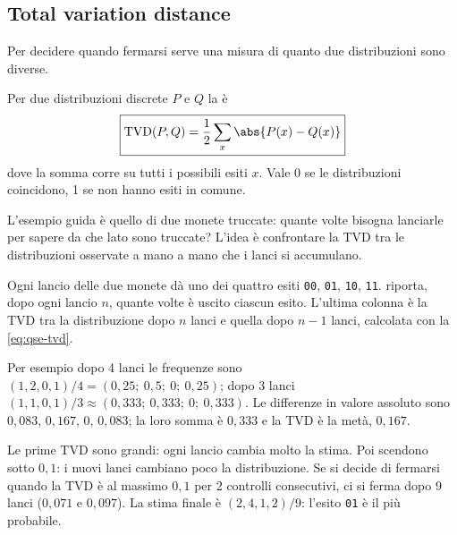 \subsection{Total variation distance}

Per decidere quando fermarsi serve una misura di quanto due distribuzioni sono diverse.

\begin{definizione}
Per due distribuzioni discrete $P$ e $Q$ la  è
\begin{equation}
\label{eq:qse-tvd}
\boxed{\mathrm{TVD}(P, Q) = \frac{1}{2}\sum_x \abs{P(x) - Q(x)}}
\end{equation}
dove la somma corre su tutti i possibili esiti $x$. Vale 0 se le distribuzioni coincidono, 1 se non hanno esiti in
comune.
\end{definizione}

L'esempio guida è quello di due monete truccate: quante volte bisogna lanciarle per sapere da che lato sono truccate?
L'idea è confrontare la TVD tra le distribuzioni osservate a mano a mano che i lanci si accumulano.

\begin{esempio}
Ogni lancio delle due monete dà uno dei quattro esiti \texttt{00}, \texttt{01}, \texttt{10}, \texttt{11}.
 riporta, dopo ogni lancio $n$, quante volte è uscito ciascun esito. L'ultima colonna è la TVD
tra la distribuzione dopo $n$ lanci e quella dopo $n-1$ lanci, calcolata con la \eqref{eq:qse-tvd}.

Per esempio dopo 4 lanci le frequenze sono $(1, 2, 0, 1)/4 = (0{,}25;\ 0{,}5;\ 0;\ 0{,}25)$; dopo 3 lanci
$(1, 1, 0, 1)/3 \approx (0{,}333;\ 0{,}333;\ 0;\ 0{,}333)$. Le differenze in valore assoluto sono $0{,}083$, $0{,}167$,
$0$, $0{,}083$; la loro somma è $0{,}333$ e la TVD è la metà, $0{,}167$.

Le prime TVD sono grandi: ogni lancio cambia molto la stima. Poi scendono sotto $0{,}1$: i nuovi lanci cambiano poco
la distribuzione. Se si decide di fermarsi quando la TVD è al massimo $0{,}1$ per 2 controlli consecutivi, ci si ferma
dopo 9 lanci ($0{,}071$ e $0{,}097$). La stima finale è $(2, 4, 1, 2)/9$: l'esito \texttt{01} è il più probabile.
\end{esempio}

